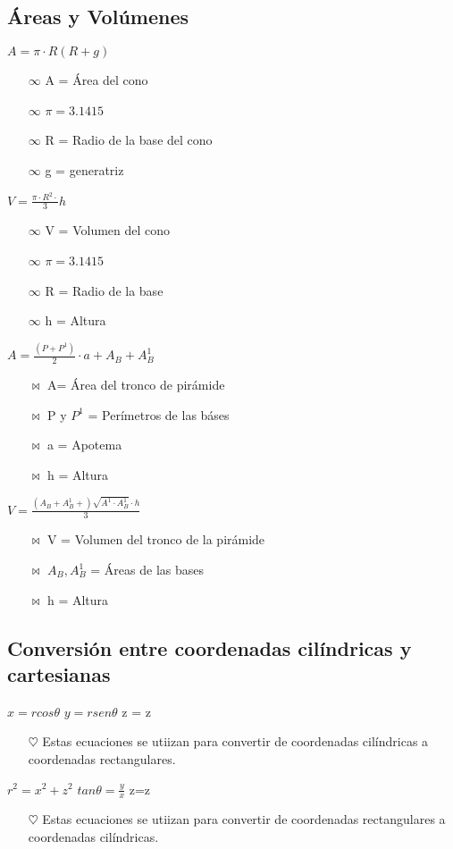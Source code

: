 \documentclass[a4peper, 12pt]{article}
\begin{document}
\subsection{Áreas y Volúmenes}

$A= \pi \cdot R (R+g)$

\begin{itemize}
    \item[$\infty$] A = Área del cono
    \item[$\infty$] $\pi = 3.1415$
    \item[$\infty$] R = Radio de la base del cono
    \item[$\infty$] g = generatriz
\end{itemize}

$V= \frac{\pi \cdot R^2 \cdot}{3} h$

\begin{itemize}
    \item[$\infty$] V = Volumen del cono
    \item[$\infty$] $\pi = 3.1415$
    \item[$\infty$] R = Radio de la base
    \item[$\infty$] h = Altura
\end{itemize}

$A= \frac{(P+P^1)}{2} \cdot a + A_{B} + A^1_{B}$
\begin{itemize}
    \item[$\Join$] A= Área del tronco de pirámide
    \item[$\Join$] P y $P^1$ = Perímetros de las báses
    \item[$\Join$] a = Apotema
    \item[$\Join$] h = Altura
\end{itemize}

$V= \frac{(A_{B}+A^1_{B}+) \sqrt{A^1 \cdot A^1_{B}}  \cdot h}{3}$

\begin{itemize}
    \item[$\Join$] V = Volumen del tronco de la pirámide
    \item[$\Join$] $A_{B}, A^1_{B}$ = Áreas de las bases 
    \item[$\Join$] h = Altura
\end{itemize}

\subsection{Conversión entre coordenadas cilíndricas y cartesianas}


$x =  r cos \theta$
$y = r sen \theta$
z = z
\begin{itemize}
    \item[$\heartsuit$] Estas ecuaciones se utiizan para convertir de coordenadas cilíndricas a coordenadas rectangulares.
\end{itemize}

$r^2 = x^2+z^2 $
$tan \theta = \frac{y}{x}$
z=z 

\begin{itemize}
    \item[$\heartsuit$] Estas ecuaciones se utiizan para convertir de coordenadas rectangulares a coordenadas cilíndricas.
\end{itemize}
\end{document}

